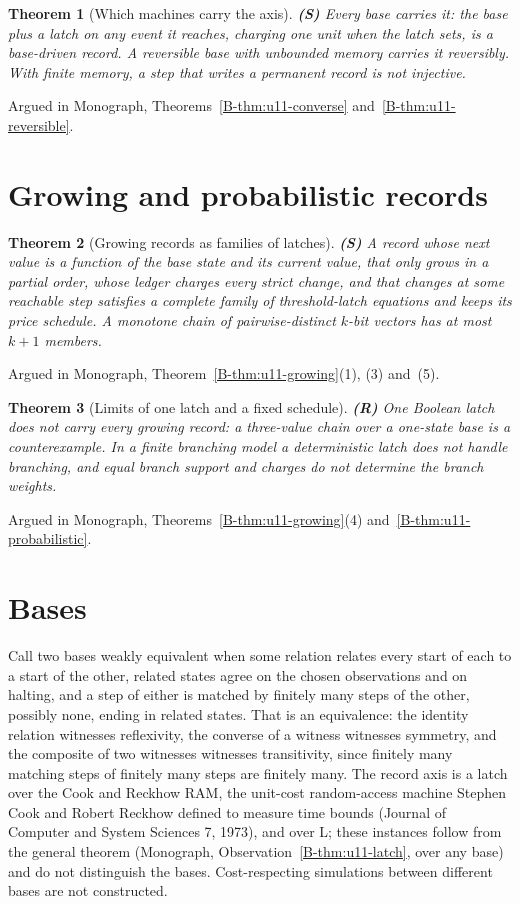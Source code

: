 \documentclass[11pt, a4paper]{report}
\theoremstyle{definition}
\theoremstyle{plain}
\newtheorem{theorem}{Theorem}[chapter]
\begin{document}
\begin{theorem}[Which machines carry the axis] \textbf{(S)}
Every base carries it: the base plus a latch on any event it reaches, charging one unit when the latch sets, is a base-driven record. A reversible base with unbounded memory carries it reversibly. With finite memory, a step that writes a permanent record is not injective.
\end{theorem}
\noindent Argued in Monograph, Theorems~\ref{B-thm:u11-converse} and~\ref{B-thm:u11-reversible}.

\section{Growing and probabilistic records}

\begin{theorem}[Growing records as families of latches] \textbf{(S)}
A record whose next value is a function of the base state and its current value, that only grows in a partial order, whose ledger charges every strict change, and that changes at some reachable step satisfies a complete family of threshold-latch equations and keeps its price schedule. A monotone chain of pairwise-distinct $k$-bit vectors has at most $k+1$ members.
\end{theorem}
\noindent Argued in Monograph, Theorem~\ref{B-thm:u11-growing}(1), (3) and~(5).

\begin{theorem}[Limits of one latch and a fixed schedule] \textbf{(R)}
One Boolean latch does not carry every growing record: a three-value chain over a one-state base is a counterexample. In a finite branching model a deterministic latch does not handle branching, and equal branch support and charges do not determine the branch weights.
\end{theorem}
\noindent Argued in Monograph, Theorems~\ref{B-thm:u11-growing}(4) and~\ref{B-thm:u11-probabilistic}.

\section{Bases}

Call two bases weakly equivalent when some relation relates every start of each to a start of the other, related states agree on the chosen observations and on halting, and a step of either is matched by finitely many steps of the other, possibly none, ending in related states. That is an equivalence: the identity relation witnesses reflexivity, the converse of a witness witnesses symmetry, and the composite of two witnesses witnesses transitivity, since finitely many matching steps of finitely many steps are finitely many. The record axis is a latch over the Cook and Reckhow RAM, the unit-cost random-access machine Stephen Cook and Robert Reckhow defined to measure time bounds (Journal of Computer and System Sciences 7, 1973), and over L; these instances follow from the general theorem (Monograph, Observation~\ref{B-thm:u11-latch}, over any base) and do not distinguish the bases. Cost-respecting simulations between different bases are not constructed.
\end{document}
